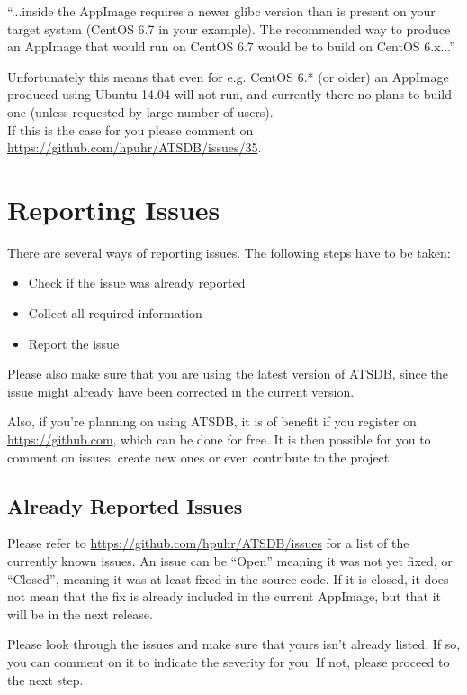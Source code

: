 ``...inside the AppImage requires a newer glibc version than is present on your target system (CentOS 6.7 in your example). The recommended way to produce an AppImage that would run on CentOS 6.7 would be to build on CentOS 6.x...''

Unfortunately this means that even for e.g.  CentOS 6.* (or older) an AppImage produced using Ubuntu 14.04 will not run, and currently there no plans to build one (unless requested by large number of users).\\

If this is the case for you please comment on \url{https://github.com/hpuhr/ATSDB/issues/35}.


\section{Reporting Issues}

There are several ways of reporting issues. The following steps have to be taken:

\begin{itemize}  
\item Check if the issue was already reported
\item Collect all required information
\item Report the issue
\end{itemize} 

Please also make sure that you are using the latest version of ATSDB, since the issue might already have been corrected in the current version.

Also, if you're planning on using ATSDB, it is of benefit if you register on \url{https://github.com}, which can be done for free. It is then possible for you to comment on issues, create new ones or even contribute to the project.

\subsection{Already Reported Issues}

Please refer to \url{https://github.com/hpuhr/ATSDB/issues} for a list of the currently known issues. An issue can be ``Open'' meaning it was not yet fixed, or ``Closed'', meaning it was at least fixed in the source code. If it is closed, it does not mean that the fix is already included in the current AppImage, but that it will be in the next release.

Please look through the issues and make sure that yours isn't already listed. If so, you can comment on it to indicate the severity for you. If not, please proceed to the next step.

